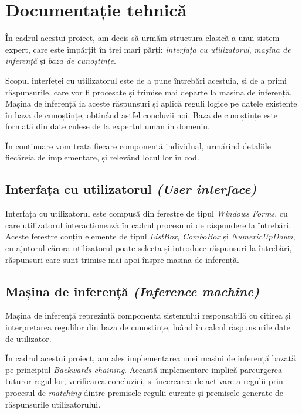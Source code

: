 \documentclass[12pt]{article}
\begin{document}
    \section{Documentație tehnică}
    În cadrul acestui proiect, am decis să urmăm structura clasică a unui sistem expert, care este împărțit în trei mari părți: \textit{interfața cu utilizatorul}, \textit{mașina de inferență} și \textit{baza de cunoștințe}.

    Scopul interfeței cu utilizatorul este de a pune întrebări acestuia, și de a primi răspunsurile, care vor fi procesate și trimise mai departe la mașina de inferență. Mașina de inferență ia aceste răspunsuri și aplică reguli logice pe datele existente în baza de cunoștințe, obținând astfel concluzii noi. Baza de cunoștințe este formată din date culese de la expertul uman în domeniu.

    În continuare vom trata fiecare componentă individual, urmărind detaliile fiecăreia de implementare, și relevând locul lor în cod.

        \subsection{Interfața cu utilizatorul \textit{(User interface)}}
        Interfața cu utilizatorul este compusă din ferestre de tipul \textit{Windows Forms}, cu care utilizatorul interacționează în cadrul procesului de răspundere la întrebări. Aceste ferestre conțin elemente de tipul \textit{ListBox}, \textit{ComboBox} și \textit{NumericUpDown}, cu ajutorul cărora utilizatorul poate selecta și introduce răspunsuri la întrebări, răspunsuri care sunt trimise mai apoi înspre mașina de inferență.

        \subsection{Mașina de inferență \textit{(Inference machine)}}
        Mașina de inferență reprezintă componenta sistemului responsabilă cu citirea și interpretarea regulilor din baza de cunoștințe, luând în calcul răspunsurile date de utilizator.

        În cadrul acestui proiect, am ales implementarea unei mașini de inferență bazată pe principiul \textit{Backwards chaining}. Această implementare implică parcurgerea tuturor regulilor, verificarea concluziei, și încercarea de activare a regulii prin procesul de \textit{matching} dintre premisele regulii curente și premisele generate de răspunsurile utilizatorului.
\end{document}
